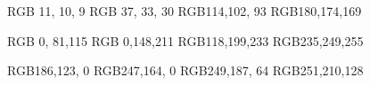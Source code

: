 \definecolor{content_dark}   {RGB}{ 11, 10,  9}
\definecolor{content_normal} {RGB}{ 37, 33, 30}
\definecolor{content_light}  {RGB}{114,102, 93}
\definecolor{content_bright} {RGB}{180,174,169}

\definecolor{accent_dark}    {RGB}{  0, 81,115}
\definecolor{accent_normal}  {RGB}{  0,148,211}
\definecolor{accent_light}   {RGB}{118,199,233}
\definecolor{accent_bright}  {RGB}{235,249,255}

\definecolor{stress_dark}    {RGB}{186,123,  0}
\definecolor{stress_normal}  {RGB}{247,164,  0}
\definecolor{stress_light}   {RGB}{249,187, 64}
\definecolor{stress_bright}  {RGB}{251,210,128}
